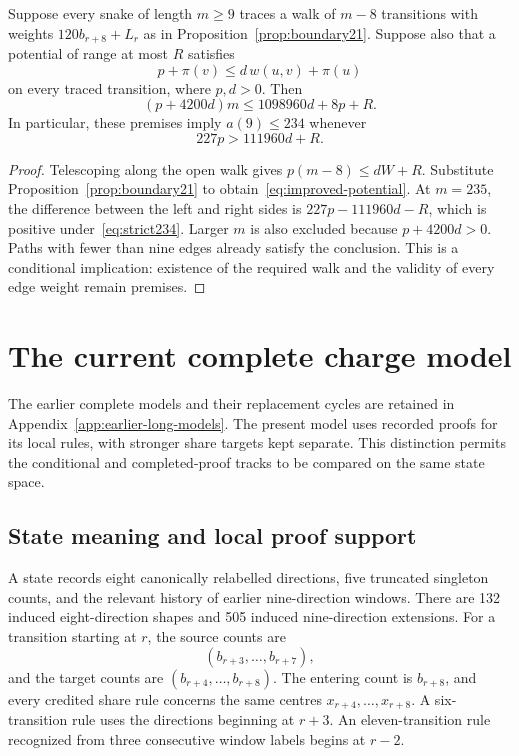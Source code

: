 \begin{corollary}\label{cor:potential234}
Suppose every snake of length $m\ge9$ traces a walk of $m-8$ transitions with weights $120b_{r+8}+L_r$ as in Proposition~\ref{prop:boundary21}. Suppose also that a potential of range at most $R$ satisfies
\[
p+\pi(v)\le d\,w(u,v)+\pi(u)
\]
on every traced transition, where $p,d>0$. Then
\begin{equation}\label{eq:improved-potential}
(p+4200d)m\le1098960d+8p+R.
\end{equation}
In particular, these premises imply $a(9)\le234$ whenever
\begin{equation}\label{eq:strict234}
227p>111960d+R.
\end{equation}
\end{corollary}
\begin{proof}
Telescoping along the open walk gives $p(m-8)\le dW+R$. Substitute Proposition~\ref{prop:boundary21} to obtain~\eqref{eq:improved-potential}. At $m=235$, the difference between the left and right sides is $227p-111960d-R$, which is positive under~\eqref{eq:strict234}. Larger $m$ is also excluded because $p+4200d>0$. Paths with fewer than nine edges already satisfy the conclusion. This is a conditional implication: existence of the required walk and the validity of every edge weight remain premises.
\end{proof}

\section{The current complete charge model}\label{sec:current-model}
The earlier complete models and their replacement cycles are retained in Appendix~\ref{app:earlier-long-models}. The present model uses recorded proofs for its local rules, with stronger share targets kept separate. This distinction permits the conditional and completed-proof tracks to be compared on the same state space.

\subsection{State meaning and local proof support}
A state records eight canonically relabelled directions, five truncated singleton counts, and the relevant history of earlier nine-direction windows. There are 132 induced eight-direction shapes and 505 induced nine-direction extensions. For a transition starting at $r$, the source counts are
\[
(b_{r+3},\ldots,b_{r+7}),
\]
and the target counts are $(b_{r+4},\ldots,b_{r+8})$. The entering count is $b_{r+8}$, and every credited share rule concerns the same centres $x_{r+4},\ldots,x_{r+8}$. A six-transition rule uses the directions beginning at $r+3$. An eleven-transition rule recognized from three consecutive window labels begins at $r-2$.

